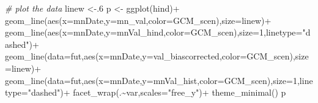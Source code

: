 \documentclass[
]{article}
\newenvironment{Shaded}{\begin{snugshade}}{\end{snugshade}}
\newcommand{\AttributeTok}[1]{\textcolor[rgb]{0.77,0.63,0.00}{#1}}
\newcommand{\CommentTok}[1]{\textcolor[rgb]{0.56,0.35,0.01}{\textit{#1}}}
\newcommand{\DecValTok}[1]{\textcolor[rgb]{0.00,0.00,0.81}{#1}}
\newcommand{\FunctionTok}[1]{\textcolor[rgb]{0.00,0.00,0.00}{#1}}
\newcommand{\NormalTok}[1]{#1}
\newcommand{\OtherTok}[1]{\textcolor[rgb]{0.56,0.35,0.01}{#1}}
\newcommand{\SpecialCharTok}[1]{\textcolor[rgb]{0.00,0.00,0.00}{#1}}
\newcommand{\StringTok}[1]{\textcolor[rgb]{0.31,0.60,0.02}{#1}}
\begin{document}
\begin{Shaded}
\begin{Highlighting}[]
      \CommentTok{\# plot the data}
\NormalTok{    linew }\OtherTok{\textless{}{-}}\NormalTok{.}\DecValTok{6}
\NormalTok{       p }\OtherTok{\textless{}{-}} \FunctionTok{ggplot}\NormalTok{(hind)}\SpecialCharTok{+}
         \FunctionTok{geom\_line}\NormalTok{(}\FunctionTok{aes}\NormalTok{(}\AttributeTok{x=}\NormalTok{mnDate,}\AttributeTok{y=}\NormalTok{mn\_val,}\AttributeTok{color=}\NormalTok{GCM\_scen),}\AttributeTok{size=}\NormalTok{linew)}\SpecialCharTok{+}
          \FunctionTok{geom\_line}\NormalTok{(}\FunctionTok{aes}\NormalTok{(}\AttributeTok{x=}\NormalTok{mnDate,}\AttributeTok{y=}\NormalTok{mnVal\_hind,}\AttributeTok{color=}\NormalTok{GCM\_scen),}\AttributeTok{size=}\DecValTok{1}\NormalTok{,}\AttributeTok{linetype=}\StringTok{"dashed"}\NormalTok{)}\SpecialCharTok{+}
         \FunctionTok{geom\_line}\NormalTok{(}\AttributeTok{data=}\NormalTok{fut,}\FunctionTok{aes}\NormalTok{(}\AttributeTok{x=}\NormalTok{mnDate,}\AttributeTok{y=}\NormalTok{val\_biascorrected,}\AttributeTok{color=}\NormalTok{GCM\_scen),}\AttributeTok{size=}\NormalTok{linew)}\SpecialCharTok{+}
          \FunctionTok{geom\_line}\NormalTok{(}\AttributeTok{data=}\NormalTok{fut,}\FunctionTok{aes}\NormalTok{(}\AttributeTok{x=}\NormalTok{mnDate,}\AttributeTok{y=}\NormalTok{mnVal\_hist,}\AttributeTok{color=}\NormalTok{GCM\_scen),}\AttributeTok{size=}\DecValTok{1}\NormalTok{,}\AttributeTok{linetype=}\StringTok{"dashed"}\NormalTok{)}\SpecialCharTok{+}
         \FunctionTok{facet\_wrap}\NormalTok{(.}\SpecialCharTok{\textasciitilde{}}\NormalTok{var,}\AttributeTok{scales=}\StringTok{"free\_y"}\NormalTok{)}\SpecialCharTok{+}
         \FunctionTok{theme\_minimal}\NormalTok{()}
\NormalTok{      p}
      

\end{Highlighting}
\end{Shaded}
\end{document}
